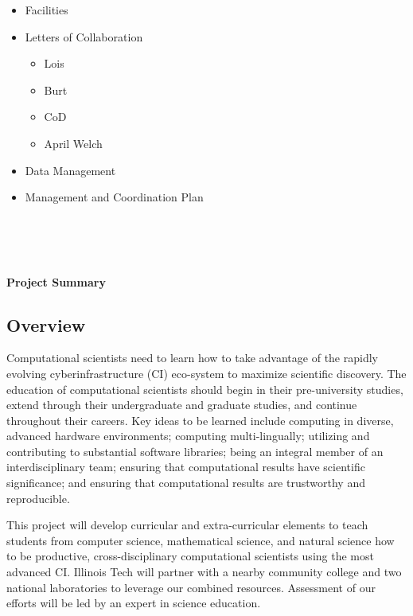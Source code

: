 \documentclass[11pt]{NSFamsart}
\newcommand{\done}{\textcolor{green}{\checkmark}}
\begin{document}
\begin{itemize}
\item[\done] Facilities

\item[\done] Letters of Collaboration
\begin{itemize}
\item[\done] Lois
\item[\done] Burt
\item[\done] CoD
\item[\done] April Welch
\end{itemize}

\item[\done] Data Management

\item[\done] Management and Coordination Plan

\end{itemize}

\bigskip

\noindent
{}\qquad
{} \qquad
{} \\
 \qquad
{}\\
\\

\newpage \setcounter{page}{1} %

\centerline{\Large \textbf{Project Summary}} \hypertarget{ProjSumm}{}
\subsection*{Overview}
Computational scientists need to learn how to take advantage of the rapidly evolving cyberinfrastructure (CI) eco-system to maximize scientific discovery. The education of computational scientists should begin in their pre-university studies,  extend through their undergraduate and graduate studies, and continue throughout their careers. Key ideas to be learned include computing in diverse, advanced hardware environments; computing multi-lingually; utilizing and contributing to substantial software libraries; being an integral member of an interdisciplinary team; ensuring that computational results have scientific significance; and ensuring that computational results are trustworthy and reproducible.  

This project will develop curricular and extra-curricular elements to teach students from computer science, mathematical science, and natural science how to be productive, cross-disciplinary computational scientists using the most advanced CI. Illinois Tech will partner with a nearby community college and two national laboratories to leverage our combined resources. Assessment of our efforts will be led by an expert in science education.
\end{document}
